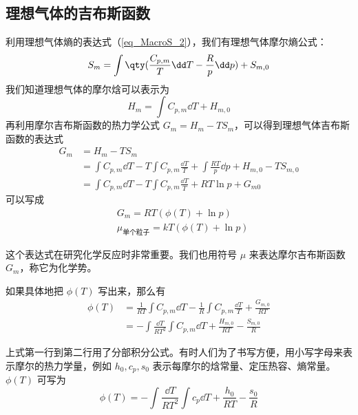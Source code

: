 \subsection{理想气体的吉布斯函数}
利用理想气体熵的表达式（\autoref{eq_MacroS_2}），我们有理想气体摩尔熵公式：
\begin{equation}
S_m=\int \qty(\frac{C_{p,m}}{T}\dd T-\frac{R}{p}\dd p)+S_{m,0}
\end{equation}
我们知道理想气体的摩尔焓可以表示为
\begin{equation}
H_m=\int C_{p,m}\dd T+H_{m,0}
\end{equation}
再利用摩尔吉布斯函数的热力学公式 $G_m=H_m-TS_m$，可以得到理想气体吉布斯函数的表达式
\begin{equation}
\begin{aligned}
G_m&=H_m-TS_m\\
&=\int C_{p,m} \dd T - T\int C_{p,m} \frac{\dd T}{T}+\int \frac{RT}{p}\dd p +H_{m,0}-TS_{m,0}
\\
&=\int C_{p,m} \dd T - T\int C_{p,m} \frac{\dd T}{T}+RT\ln p+G_{m0}
\end{aligned}
\end{equation}
可以写成
\begin{equation}\label{eq_GibbsG_3}
\begin{aligned}
&G_m=RT(\phi(T)+\ln p)\\
&\mu_{\text{单个粒子}} = kT(\phi(T)+\ln p)
\end{aligned}
\end{equation}

这个表达式在研究化学反应时非常重要。我们也用符号 $\mu$ 来表达摩尔吉布斯函数 $G_m$，称它为化学势。

如果具体地把 $\phi(T)$ 写出来，那么有
\begin{equation}\label{eq_GibbsG_4}
\begin{aligned}
\phi(T)&=\frac{1}{RT}\int C_{p,m}\dd T-\frac{1}{R}\int C_{p,m}\frac{\dd T}{T}+\frac{G_{m,0}}{RT}\\
&=-\int \frac{\dd T}{RT^2}\int C_{p,m}\dd T+\frac{H_{m,0}}{RT}-\frac{S_{m,0}}{R}
\end{aligned}
\end{equation}

上式第一行到第二行用了分部积分公式。有时人们为了书写方便，用小写字母来表示摩尔的热力学量，例如 $h_0,c_p,s_0$ 表示每摩尔的焓常量、定压热容、熵常量。$\phi(T)$ 可写为
\begin{equation}
\phi(T)=-\int\frac{\dd T}{RT^2}\int c_{p}\dd T+\frac{h_{0}}{RT}-\frac{s_{0}}{R}
\end{equation}

